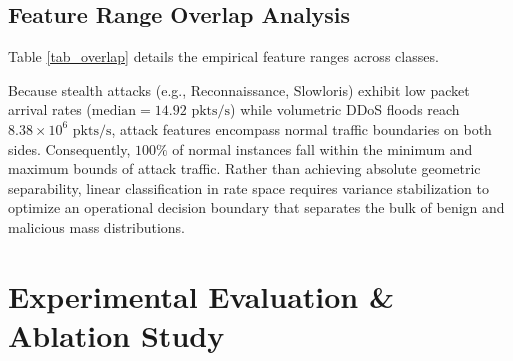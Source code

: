 \documentclass[conference]{IEEEtran}
\begin{document}
\subsection{Feature Range Overlap Analysis}
Table \ref{tab_overlap} details the empirical feature ranges across classes.

\begin{table}[htbp]
\caption{Raw Feature Distribution and Geometric Overlap (Test Set)}
\label{tab_overlap}
\begin{center}
\end{center}
\end{table}

Because stealth attacks (e.g., Reconnaissance, Slowloris) exhibit low packet arrival rates ($\text{median} = 14.92\text{ pkts/s}$) while volumetric DDoS floods reach $8.38 \times 10^6\text{ pkts/s}$, attack features encompass normal traffic boundaries on both sides. Consequently, $100\%$ of normal instances fall within the minimum and maximum bounds of attack traffic. Rather than achieving absolute geometric separability, linear classification in rate space requires variance stabilization to optimize an operational decision boundary that separates the bulk of benign and malicious mass distributions.

\section{Experimental Evaluation & Ablation Study}
\end{document}
